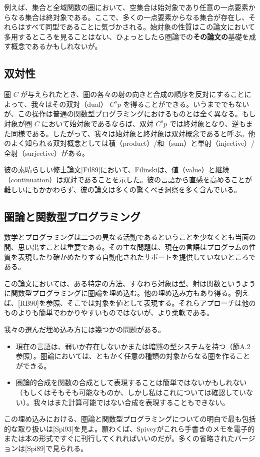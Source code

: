 \documentclass[11pt, oneside]{jsbook}   	%
\begin{document}
例えば、集合と全域関数の圏において、空集合は始対象であり任意の一点要素からなる集合は終対象である。ここで、多くの一点要素からなる集合が存在し、それらはすべて同型であることに気づかされる。始対象の性質はこの論文において多用するところを見ることはない、ひょっとしたら圏論での{\bf その論文の}基礎を成す概念であるかもしれないが。

\subsection{ 双対性 }
圏 $C$ が与えられたとき、圏の各々の射の向きと合成の順序を反対にすることによって、我々はその双対（dual）  $C^op$ を得ることができる。いうまででもないが、この操作は普通の関数型プログラミングにおけるものとは全く異なる。もし対象が圏 $C$ において始対象であるならば、双対 $C^op$ では終対象となり、逆もまた同様である。したがって、我々は始対象と終対象は双対概念であると呼ぶ。他のよく知られる双対概念としては積（product）/和（sum）と単射（injective）/全射（surjective）がある。

彼の素晴らしい修士論文[Fil89]において、Filinskiは、値（value）と継続（continuation）は双対であることを示した。彼の言語から直感を高めることが難しいにもかかわらず、彼の論文は多くの驚くべき洞察を多く含んでいる。
\subsection{ 圏論と関数型プログラミング }
数学とプログラミングは二つの異なる活動であるということを少なくとも当面の間、思い出すことは重要である。その主な問題は、現在の言語はプログラムの性質を表現したり確かめたりする自動化されたサポートを提供していないところである。

この論文においては、ある特定の方法、すなわち対象は型、射は関数というように関数型プログラミングに圏論を埋め込む。他の埋め込み方もあり得る。例えば、[RB90]を参照、そこでは対象を値として表現する。それらアプローチは他のものよりも簡単でわかりやすいものではないが、より柔軟である。

我々の選んだ埋め込み方には幾つかの問題がある。
\begin{itemize}
\item 現在の言語は、弱いか存在しないかまたは暗黙の型システムを持つ（節A.2参照）。圏論においては、ともかく任意の種類の対象からなる圏を作ることができる。
\item 圏論的合成を関数の合成として表現することは簡単ではないかもしれない（もしくはそもそも可能なものか、しかし私はこれについては確認していない）。我々はまた計算可能ではない合成を表現することもできない。
\end{itemize}
この埋め込みにおける、圏論と関数型プログラミングについての明白で最も包括的な取り扱いは[Spi93]を見よ。願わくば、Spiveyがこれら手書きのメモを電子的または本の形式ですぐに刊行してくれればいいのだが。多くの省略されたバージョンは[Spi89]で見られる。
\end{document}
